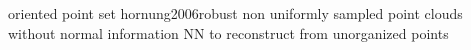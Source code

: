 \cite{kazhdan2005reconstruction} oriented point set hornung2006robust
\cite{hornung2006robust} non uniformly sampled point clouds without normal information
\cite{yu1999surface} NN to reconstruct from unorganized points





\endinput
